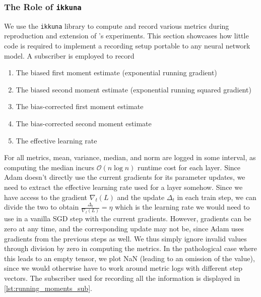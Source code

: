 \subsubsection{The Role of \texttt{ikkuna}}%
\label{sub:use_of_ikkuna_for_optimiser_research}

We use the \texttt{ikkuna} library to compute and record various metrics during
reproduction and extension of \citeauthor{kingma2014adam}'s experiments. This
section showcases how little code is required to implement a recording setup
portable to any neural network model. A subscriber is employed to record
\begin{enumerate}
    \item The biased first moment estimate (exponential running gradient)
    \item The biased second moment estimate (exponential running squared
        gradient)
    \item The bias-corrected first moment estimate
    \item The bias-corrected second moment estimate
    \item The effective learning rate
\end{enumerate}

For all metrics, mean, variance, median, and norm are logged in some interval,
as computing the median incurs $\mathcal{O}(n\log n)$ runtime cost for each
layer. Since Adam doesn't directly use the current gradients for its parameter
updates, we need to extract the effective learning rate used for a layer
somehow. Since we have access to the gradient $\nabla_t(L)$ and the update
$\Delta_t$ in each train step, we can divide the two to obtain
$\frac{\Delta_t}{\nabla_t(L)}=\eta$ which is the learning rate we would need to
use in a vanilla SGD step with the current gradients. However, gradients can be
zero at any time, and the corresponding update may not be, since Adam uses
gradients from the previous steps as well. We thus simply ignore invalid values
through division by zero in computing the metrics. In the pathological case
where this leads to an empty tensor, we plot NaN (leading to an omission of the
value), since we would otherwise have to work around metric logs with different
step vectors.
The subscriber used for recording all the information is displayed in
\cref{lst:running_moments_sub}.

